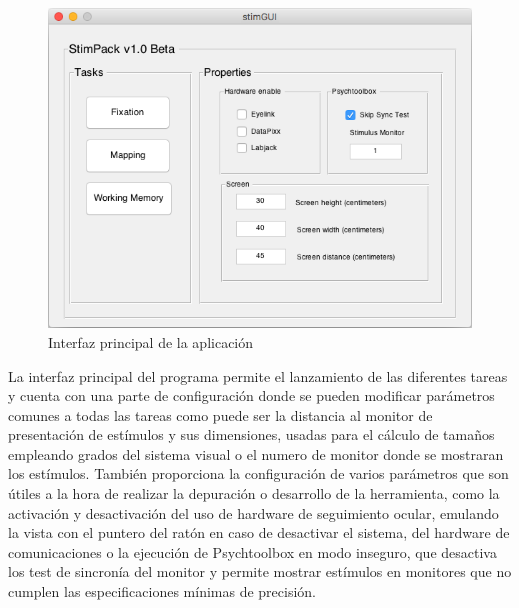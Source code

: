 \documentclass[conference]{IEEEtran}
\begin{document}
\begin{figure}[htbp]
\centerline{\includegraphics[width=\linewidth]{figures/main_gui}}
\caption{Interfaz principal de la aplicación}
\label{figmainGUI}
\end{figure}

La interfaz principal del programa permite el lanzamiento de las diferentes tareas y cuenta con una parte de configuración donde se pueden modificar parámetros comunes a todas las tareas como puede ser la distancia al monitor de presentación de estímulos y sus dimensiones, usadas para el cálculo de tamaños empleando grados del sistema visual o el numero de monitor donde se mostraran los estímulos. También proporciona la configuración de              varios parámetros que son útiles a la hora de realizar la depuración o desarrollo de la herramienta, como la activación y desactivación del uso de hardware de seguimiento ocular, emulando la vista con el puntero del ratón en caso de desactivar el sistema, del hardware de comunicaciones o la ejecución de Psychtoolbox en modo inseguro, que desactiva los test de sincronía del monitor y permite mostrar estímulos en monitores que no cumplen las especificaciones mínimas de precisión.
\end{document}
